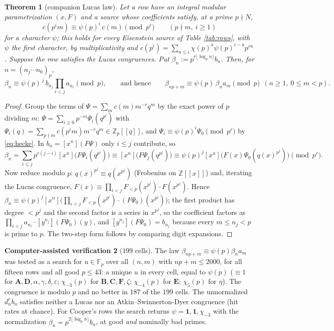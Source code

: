 \documentclass[11pt]{amsart}
\newtheorem{theorem}{Theorem}[section]
\theoremstyle{definition}
\newtheorem{verification}[theorem]{Computer-assisted verification}
\theoremstyle{remark}
\newcommand{\Q}{\mathbb Q}\newcommand{\Z}{\mathbb Z}\newcommand{\R}{\mathbb R}\newcommand{\C}{\mathbb C}\newcommand{\HH}{\mathbb H}
\newcommand{\Zp}{\mathbb Z_p}\newcommand{\Ob}{\overline{\Q}}
\begin{document}
\begin{theorem}[companion Lucas law]\label{thm:lucas}
Let a row have an integral modular parametrization $(x,F)$ and a source whose coefficients satisfy, at a prime $p\nmid N$,
\begin{equation}\label{eq:hecke}
c(p^im)\equiv\psi(p)^i\,c(m)\pmod{p^r}\qquad(p\nmid m,\ i\ge1)
\end{equation}
for a character $\psi$; this holds for every Eisenstein source of Table \ref{tab:rows}, with $\psi$ the first character, by multiplicativity and $c(p^i)=\sum_{a\le i}\chi(p)^a\psi(p)^{i-a}p^{ra}$. Suppose the row satisfies the Lucas congruences. Put $\beta_n:=p^{r\lfloor\log_pn\rfloor}b_n$. Then, for $n=(n_j\cdots n_0)_p$,
$$\beta_n\equiv\psi(p)^{\,j}\,b_{n_j}\prod_{i<j}a_{n_i}\pmod p,\qquad\text{and hence}\qquad \beta_{np+m}\equiv\psi(p)\,\beta_na_m\pmod p\ \ (n\ge1,\ 0\le m<p).$$
\end{theorem}
\begin{proof}
Group the terms of $\Psi=\sum_mc(m)m^{-r}q^m$ by the exact power of $p$ dividing $m$: $\Psi=\sum_{i\ge0}p^{-ri}\Psi_i(q^{p^i})$ with $\Psi_i(q)=\sum_{p\nmid m}c(p^im)m^{-r}q^m\in\Zp[[q]]$, and $\Psi_i\equiv\psi(p)^i\Psi_0\pmod{p^r}$ by \eqref{eq:hecke}. In $b_n=[x^n](F\Psi)$ only $i\le j$ contribute, so
$$\beta_n=\sum_{i\le j}p^{r(j-i)}[x^n]\bigl(F\Psi_i(q^{p^i})\bigr)\equiv[x^n]\bigl(F\Psi_j(q^{p^j})\bigr)\equiv\psi(p)^j[x^n]\bigl(F(x)\Psi_0(q(x)^{p^j})\bigr)\pmod{p^r}.$$
Now reduce modulo $p$: $q(x)^{p^j}\equiv q(x^{p^j})$ (Frobenius on $\Z[[x]]$) and, iterating the Lucas congruence, $F(x)\equiv\prod_{i<j}F_{<p}(x^{p^i})\cdot F(x^{p^j})$. Hence
$\beta_n\equiv\psi(p)^j[x^n]\bigl(\prod_{i<j}F_{<p}(x^{p^i})\cdot(F\Psi_0)(x^{p^j})\bigr)$; the first product has degree $<p^j$ and the second factor is a series in $x^{p^j}$, so the coefficient factors as $\prod_{i<j}a_{n_i}\cdot[y^{n_j}](F\Psi_0)(y)$, and $[y^{n_j}](F\Psi_0)=b_{n_j}$ because every $m\le n_j<p$ is prime to $p$. The two-step form follows by comparing digit expansions.
\end{proof}

\begin{verification}[$199$ cells]\label{ver:lucas}
The law $\beta_{np+m}\equiv\psi(p)\beta_na_m$ was tested as a search for $u\in\mathbb F_p$ over all $(n,m)$ with $np+m\le2000$, for all fifteen rows and all good $p\le43$: a unique $u$ in every cell, equal to $\psi(p)$ ($\equiv1$ for $\mathbf A,\mathbf D,\alpha,\gamma,\delta,\varepsilon$; $\chi_{-3}(p)$ for $\mathbf B,\mathbf C,\mathbf F,\zeta$; $\chi_{-4}(p)$ for $\mathbf E$; $\chi_5(p)$ for $\eta$). The congruence is modulo $p$ and no better in $187$ of the $199$ cells. The unnormalized $d_n^rb_n$ satisfies neither a Lucas nor an Atkin--Swinnerton-Dyer congruence (hit rates at chance). For Cooper's rows the search returns $\psi=\mathbf 1,\mathbf 1,\chi_{-3}$ with the normalization $\beta_n=p^{2\lfloor\log_pn\rfloor}b_n$, at good \emph{and} nominally bad primes.
\end{verification}
\end{document}
